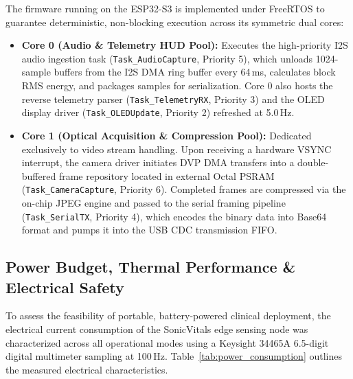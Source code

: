 \documentclass[journal]{IEEEtran}
\begin{document}
The firmware running on the ESP32-S3 is implemented under FreeRTOS to guarantee deterministic, non-blocking execution across its symmetric dual cores:
\begin{itemize}
    \item \textbf{Core 0 (Audio \& Telemetry HUD Pool):} Executes the high-priority I2S audio ingestion task (\texttt{Task\_AudioCapture}, Priority 5), which unloads 1024-sample buffers from the I2S DMA ring buffer every 64\,ms, calculates block RMS energy, and packages samples for serialization. Core 0 also hosts the reverse telemetry parser (\texttt{Task\_TelemetryRX}, Priority 3) and the OLED display driver (\texttt{Task\_OLEDUpdate}, Priority 2) refreshed at 5.0\,Hz.
    \item \textbf{Core 1 (Optical Acquisition \& Compression Pool):} Dedicated exclusively to video stream handling. Upon receiving a hardware VSYNC interrupt, the camera driver initiates DVP DMA transfers into a double-buffered frame repository located in external Octal PSRAM (\texttt{Task\_CameraCapture}, Priority 6). Completed frames are compressed via the on-chip JPEG engine and passed to the serial framing pipeline (\texttt{Task\_SerialTX}, Priority 4), which encodes the binary data into Base64 format and pumps it into the USB CDC transmission FIFO.
\end{itemize}

\subsection{Power Budget, Thermal Performance \& Electrical Safety}

To assess the feasibility of portable, battery-powered clinical deployment, the electrical current consumption of the SonicVitals edge sensing node was characterized across all operational modes using a Keysight 34465A 6.5-digit digital multimeter sampling at 100\,Hz. Table~\ref{tab:power_consumption} outlines the measured electrical characteristics.
\end{document}

